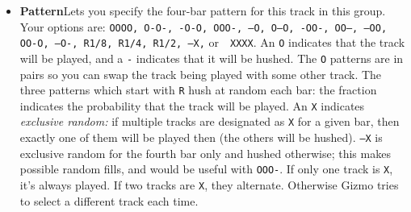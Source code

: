 \documentclass{article}
\newcommand\bump{\vspace{11in}}
\begin{document}
\begin{itemize}
\item {\bf Pattern}\quad Lets you specify the four-bar pattern for this track in this group.  Your options are: \texttt{OOOO, O-O-, -O-O, OOO-, ---O, O--O, -OO-, OO--, --OO, OO-O, --O-, R1/8, R1/4, R1/2, ---X,} or\ \ {\tt XXXX}.  An {\tt O} indicates that the track will be played, and a {\tt -} indicates that it will be hushed.  The {\tt O} patterns are in pairs so you can swap the track being played with some other track.  The three patterns which start with {\tt R} hush at random each bar: the fraction indicates the probability that the track will be played.  An {\tt X} indicates {\it exclusive random:} if multiple tracks are designated as {\tt X} for a given bar, then exactly one of them will be played then (the others will be hushed).   {\tt ---X} is exclusive random for the fourth bar only and hushed otherwise; this makes possible random fills, and would be useful with {\tt OOO-}.   If only one track is {\tt X}, it's always played.  If two tracks are {\tt X}, they alternate.  Otherwise Gizmo tries to select a different track each time.

\bump 


\end{itemize}
\end{document}
